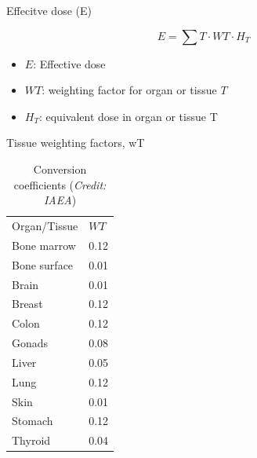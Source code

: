 \begin{frame}{Effecitve dose (E)}

\begin{block}{}

\[E=\displaystyle\sum T\cdot WT\cdot H_T\]

\begin{itemize}
\item $E$: Effective dose
\item $WT$: weighting factor for organ or tissue $T$
\item $H_T$: equivalent dose in organ or tissue T
\end{itemize}

\end{block}

\end{frame}

\begin{frame}{Tissue weighting factors, wT}

\begin{table}[H]
\caption*{Conversion coefficients (\emph{Credit: IAEA})}
\vskip 0.2cm
\begin{center}
  \begin{tabular}{ll}
  \toprule
  Organ/Tissue & $WT$  \\ \otoprule
Bone marrow & 0.12 \\ 
Bone surface & 0.01 \\
Brain & 0.01 \\
Breast & 0.12 \\
Colon & 0.12 \\
Gonads & 0.08 \\
Liver & 0.05 \\
Lung & 0.12 \\
Skin & 0.01 \\
Stomach & 0.12 \\
Thyroid & 0.04 \\ \bottomrule
\end{tabular}
\end{center}
\end{table}

\end{frame}


